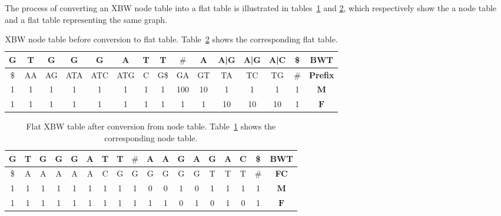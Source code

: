 \documentclass[a4paper,12pt,twoside,BCOR=10mm]{scrbook}
\begin{document}
The process of converting an XBW node table into a flat table is illustrated in tables~\ref{table:evo_node_to_flat_node}
and \ref{table:evo_node_to_flat_flat}, which respectively show the a node table and a flat table representing the same graph. \\
{
\renewcommand{\tabcolsep}{5pt}
\begin{table}[htb]
\centering
\caption[XBW node table before conversion to flat table]{XBW node table before conversion to flat table.
Table~\ref{table:evo_node_to_flat_flat} shows the corresponding flat table.}
\begin{tabular}{ | c | c | c | c | c | c | c | c | c | c | c | c | c | c | c | }
\hline
G & T & G & G & G & A & T & T & $\#$ & A & A|G & A|G & A|C & \$ & \textbf{BWT} \\ \hline
\$ & AA & AG & ATA & ATC & ATG & C & G\$ & GA & GT & TA & TC & TG & $\#$ & \textbf{Prefix} \\ \hline
1 & 1 & 1 & 1 & 1 & 1 & 1 & 1 & 100 & 10 & 1 & 1 & 1 & 1 & $\boldsymbol{M}$ \\ \hline
1 & 1 & 1 & 1 & 1 & 1 & 1 & 1 & 1 & 1 & 10 & 10 & 10 & 1 & $\boldsymbol{F}$ \\ \hline
\end{tabular}
\label{table:evo_node_to_flat_node}
\end{table}
}
\begin{table}[htb]
\centering
\caption[Flat XBW table after conversion from node table]{Flat XBW table after conversion from node table.
Table~\ref{table:evo_node_to_flat_node} shows the corresponding node table.}
\begin{tabular}{ | c | c | c | c | c | c | c | c | c | c | c | c | c | c | c | c | c | c | }
\hline
G & T & G & G & G & A & T & T & $\#$ & A & A & G & A & G & A & C & \$ & \textbf{BWT} \\ \hline
\$ & A & A & A & A & A & C & G & G & G & G & G & G & T & T & T & $\#$ & \textbf{FC} \\ \hline
1 & 1 & 1 & 1 & 1 & 1 & 1 & 1 & 1 & 0 & 0 & 1 & 0 & 1 & 1 & 1 & 1 & $\boldsymbol{M}$ \\ \hline
1 & 1 & 1 & 1 & 1 & 1 & 1 & 1 & 1 & 1 & 1 & 0 & 1 & 0 & 1 & 0 & 1 & $\boldsymbol{F}$ \\ \hline
\end{tabular}
\label{table:evo_node_to_flat_flat}
\end{table}
\end{document}
